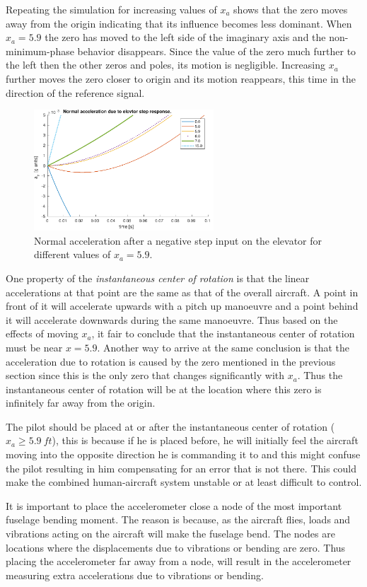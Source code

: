 Repeating the simulation for increasing values of $x_a$ shows that the zero moves away from the origin indicating that its influence becomes less dominant. When $x_a=5.9$ the zero has moved to the left side of the imaginary axis and the non-minimum-phase behavior disappears. Since the value of the zero much further to the left then the other zeros and poles, its motion is negligible. Increasing $x_a$ further moves the zero closer to origin and its motion reappears, this time in the direction of the reference signal.

\begin{figure}[ht]
    \centering
    \includegraphics[width=0.6\textwidth]{figures/an_elev_step_mult}
    \caption{Normal acceleration after a negative step input on the elevator for different values of $x_a=5.9$.}
    \label{fig:an_elev_step_mult}
\end{figure}

One property of the \emph{instantaneous center of rotation} is that the linear accelerations at that point are the same as that of the overall aircraft. A point in front of it will accelerate upwards with a pitch up manoeuvre and a point behind it will accelerate downwards during the same manoeuvre. Thus based on the effects of moving $x_a$, it fair to conclude that the instantaneous center of rotation must be near $x=5.9$. Another way to arrive at the same conclusion is that the acceleration due to rotation is caused by the zero mentioned in the previous section since this is the only zero that changes significantly with $x_a$. Thus the instantaneous center of rotation will be at the location where this zero is infinitely far away from the origin.

The pilot should be placed at or after the instantaneous center of rotation ($x_a\geq5.9\ ft$), this is because if he is placed before, he will initially feel the aircraft moving into the opposite direction he is commanding it to and this might confuse the pilot resulting in him compensating for an error that is not there. This could make the combined human-aircraft system unstable or at least difficult to control.

It is important to place the accelerometer close a node of the most important fuselage bending moment. The reason is because, as the aircraft flies, loads and vibrations acting on the aircraft will make the fuselage bend. The nodes are locations where the displacements due to vibrations or bending are zero. Thus placing the accelerometer far away from a node, will result in the accelerometer measuring extra accelerations due to vibrations or bending. 


\clearpage
